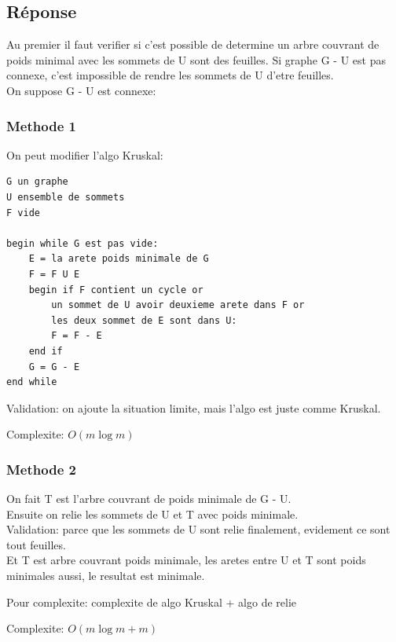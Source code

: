 \documentclass[12pt]{fphw}
\begin{document}
\subsection*{Réponse}
Au premier il faut verifier si c'est possible de determine un arbre couvrant de poids minimal avec les sommets de U sont des feuilles. Si graphe G - U est pas connexe, c'est impossible de rendre les sommets de U d'etre feuilles.\\
On suppose G - U est connexe:\\

\subsubsection*{Methode 1}
On peut modifier l'algo Kruskal:\\
\begin{lstlisting}
G un graphe
U ensemble de sommets
F vide

begin while G est pas vide:
	E = la arete poids minimale de G
	F = F U E
	begin if F contient un cycle or 
		un sommet de U avoir deuxieme arete dans F or
		les deux sommet de E sont dans U:
		F = F - E
	end if
	G = G - E
end while

\end{lstlisting}

Validation: on ajoute la situation limite, mais l'algo est juste comme Kruskal.

\begin{center}
	Complexite: \textbf{$O(m\log{}m)$}
\end{center}

\subsubsection*{Methode 2}
On fait T est l'arbre couvrant de poids minimale de G - U.\\
Ensuite on relie les sommets de U et T avec poids minimale.\\

Validation: parce que les sommets de U sont relie finalement, evidement ce sont tout feuilles.\\
Et T est arbre couvrant poids minimale, les aretes entre U et T sont poids minimales aussi, le resultat est minimale.

Pour complexite: complexite de algo Kruskal + algo de relie\\
\begin{center}
Complexite: \textbf{$O(m\log{}m+m)$}
\end{center}
\end{document}
